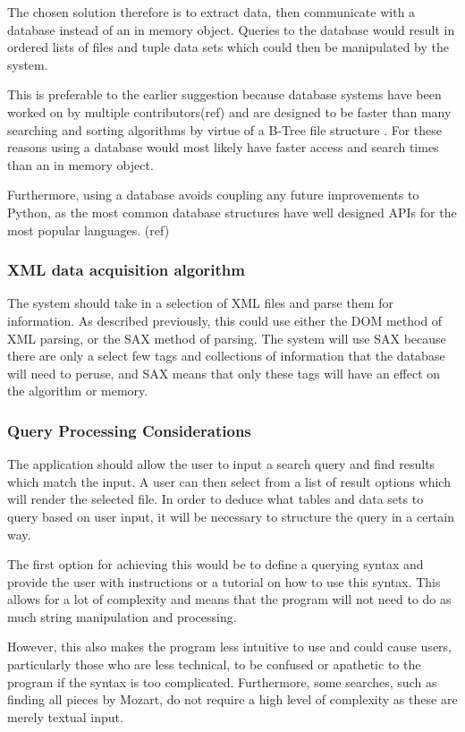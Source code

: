 The chosen solution therefore is to extract data, then communicate with a database instead of an in memory object. Queries to the database would result in ordered lists of files and tuple data sets which could then be manipulated by the system. 

This is preferable to the earlier suggestion because database systems have been worked on by multiple contributors(ref)%
 and are designed to be faster than many searching and sorting algorithms by virtue of a B-Tree file structure \parencite{SQLiteBTree}. For these reasons using a database would most likely have faster access and search times than an in memory object.

Furthermore, using a database avoids coupling any future improvements to Python, as the most common database structures have well designed APIs for the most popular languages. (ref)

\subsubsection{XML data acquisition algorithm}
The system should take in a selection of XML files and parse them for information. As described previously, this could use either the DOM method of XML parsing, or the SAX method of parsing.
The system will use SAX because there are only a select few tags and collections of information that the database will need to peruse, and SAX means that only these tags will have an effect on the algorithm or memory.

\subsubsection{Query Processing Considerations}
The application should allow the user to input a search query and find results which match the input. A user can then select from a list of result options which will render the selected file. In order to deduce what tables and data sets to query based on user input, it will be necessary to structure the query in a certain way.

The first option for achieving this would be to define a querying syntax and provide the user with instructions or a tutorial on how to use this syntax. This allows for a lot of complexity and means that the program will not need to do as much string manipulation and processing.

However, this also makes the program less intuitive to use and could cause users, particularly those who are less technical, to be confused or apathetic to the program if the syntax is too complicated. Furthermore, some searches, such as finding all pieces by Mozart, do not require a high level of complexity as these are merely textual input.

